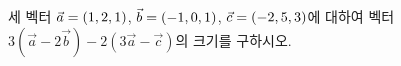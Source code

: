 세 벡터 $\vec{a}=(1{,}\mkern3mu\mathopen{}2{,}\mkern3mu\mathopen{}1)$, $\vec{b}=(-1{,}\mkern3mu\mathopen{}0{,}\mkern3mu\mathopen{}1)$, $\vec{c}=(-2{,}\mkern3mu\mathopen{}5{,}\mkern3mu\mathopen{}3)$에 대하여 벡터 $3(\vec{a}-2\vec{b})-2(3\vec{a}-\vec{c})$의 크기를 구하시오.
